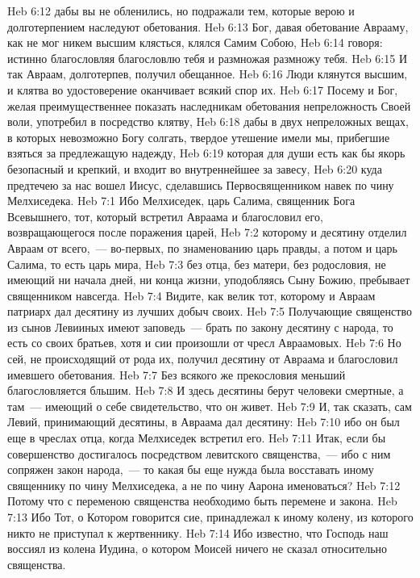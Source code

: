 \vs Heb 6:12 дабы вы не обленились, но подражали тем, которые верою и долготерпением наследуют обетования.
\vs Heb 6:13 Бог, давая обетование Аврааму, как не мог никем высшим клясться, клялся Самим Собою,
\vs Heb 6:14 говоря: истинно благословляя благословлю тебя и размножая размножу тебя.
\vs Heb 6:15 И так Авраам, долготерпев, получил обещанное.
\vs Heb 6:16 Люди клянутся высшим, и клятва во удостоверение оканчивает всякий спор их.
\vs Heb 6:17 Посему и Бог, желая преимущественнее показать наследникам обетования непреложность Своей воли, употребил в посредство клятву,
\vs Heb 6:18 дабы в двух непреложных вещах, в которых невозможно Богу солгать, твердое утешение имели мы, прибегшие взяться за предлежащую надежду,
\vs Heb 6:19 которая для души есть как бы якорь безопасный и крепкий, и входит во внутреннейшее за завесу,
\vs Heb 6:20 куда предтечею за нас вошел Иисус, сделавшись Первосвященником навек по чину Мелхиседека.
\vs Heb 7:1 Ибо Мелхиседек, царь Салима, священник Бога Всевышнего, тот, который встретил Авраама и благословил его, возвращающегося после поражения царей,
\vs Heb 7:2 которому и десятину отделил Авраам от всего,~--- во-первых, по знаменованию  царь правды, а потом и царь Салима, то есть царь мира,
\vs Heb 7:3 без отца, без матери, без родословия, не имеющий ни начала дней, ни конца жизни, уподобляясь Сыну Божию, пребывает священником навсегда.
\rsbpar\vs Heb 7:4 Видите, как велик тот, которому и Авраам патриарх дал десятину из лучших добыч своих.
\vs Heb 7:5 Получающие священство из сынов Левииных имеют заповедь~--- брать по закону десятину с народа, то есть со своих братьев, хотя и сии произошли от чресл Авраамовых.
\vs Heb 7:6 Но сей, не происходящий от рода их, получил десятину от Авраама и благословил имевшего обетования.
\vs Heb 7:7 Без всякого же прекословия меньший благословляется бльшим.
\vs Heb 7:8 И здесь десятины берут человеки смертные, а там~--- имеющий о себе свидетельство, что он живет.
\vs Heb 7:9 И, так сказать, сам Левий, принимающий десятины, в  Авраама дал десятину:
\vs Heb 7:10 ибо он был еще в чреслах отца, когда Мелхиседек встретил его.
\rsbpar\vs Heb 7:11 Итак, если бы совершенство достигалось посредством левитского священства,~--- ибо с ним сопряжен закон народа,~--- то какая бы еще нужда была восставать иному священнику по чину Мелхиседека, а не по чину Аарона именоваться?
\vs Heb 7:12 Потому что с переменою священства необходимо быть перемене и закона.
\vs Heb 7:13 Ибо Тот, о Котором говорится сие, принадлежал к иному колену, из которого никто не приступал к жертвеннику.
\vs Heb 7:14 Ибо известно, что Господь наш воссиял из колена Иудина, о котором Моисей ничего не сказал относительно священства.
